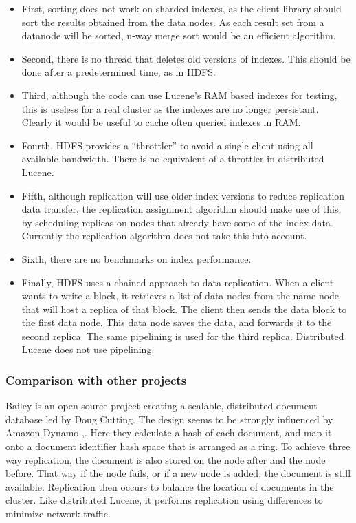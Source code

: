 \documentclass[a4paper,10pt]{article}
\begin{document}
\begin{itemize}
\item First, sorting does not work on sharded indexes, as the client library should sort the results obtained from the data nodes. As each result set from a datanode will be sorted, n-way merge sort would be an efficient algorithm.
\item Second, there is no thread that deletes old versions of indexes. This should be done after a predetermined time, as in HDFS. 
\item Third, although the code can use Lucene's RAM based indexes for testing, this is useless for a real cluster as the indexes are no longer persistant. Clearly it would be useful to cache often queried indexes in RAM. 
\item Fourth, HDFS provides a ``throttler'' to avoid a single client using all available bandwidth. There is no equivalent of a throttler in distributed Lucene. 
\item Fifth, although replication will use older index versions to reduce replication data transfer, the replication assignment algorithm should make use of this, by scheduling replicas on nodes that already have some of the index data. Currently the replication algorithm does not take this into account. 
\item Sixth, there are no benchmarks on index performance. 
\item Finally, HDFS uses a chained approach to data replication. When a client wants to write a block, it retrieves a list of data nodes from the name node that will host a replica of that block. The client then sends the data block to the first data node. This data node saves the data, and forwards it to the second replica. The same pipelining is used for the third replica. Distributed Lucene does not use pipelining. 
\end{itemize}

\subsubsection{Comparison with other projects}

Bailey \cite{bailey} is an open source project creating a scalable, distributed document database led by Doug Cutting. The design seems to be strongly influenced by Amazon Dynamo \cite{vogelBlog},\cite{dynamo}. Here they calculate a hash of each document, and map it onto a document identifier hash space that is arranged as a ring. To achieve three way replication, the document is also stored on the node after and the node before. That way if the node fails, or if a new node is added, the document is still available. Replication then occurs to balance the location of documents in the cluster. Like distributed Lucene, it performs replication using differences to minimize network traffic.
\end{document}
